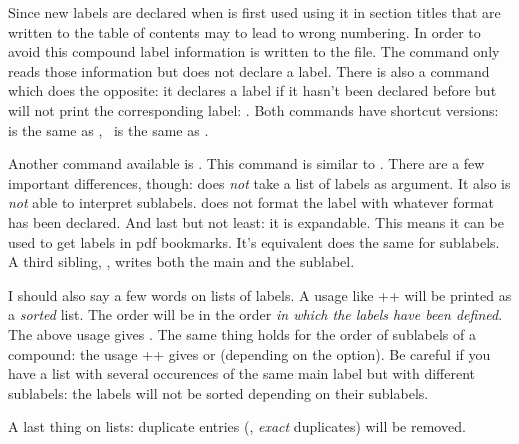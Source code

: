 \documentclass[load-preamble+,ngerman,british,american]{cnltx-doc}
\begin{document}
Since new labels are declared when  is first used using it in section
titles that are written to the table of contents may to lead to wrong
numbering.  In order to avoid this compound label information is written to
the  file.  The command 
only reads those information but does not declare a label.  There is also a
command which does the opposite: it declares a label if it hasn't been
declared before but will not print the corresponding label:
.  Both commands have shortcut
versions: \code{+} is the same as , \sarg\ is
the same as .

Another command available is .  This command is
similar to .  There are a few important differences, though:
 does \emph{not} take a list of labels as argument.  It also is
\emph{not} able to interpret sublabels.   does not format the
label with whatever format has been declared.  And last but not least: it is
expandable.  This means it can be used to get labels in \ac{pdf} bookmarks.
It's equivalent  does
the same for sublabels.  A third sibling, , writes both the main and the sublabel.

I should also say a few words on lists of labels.  A usage like
\verbcode++ will be printed as a \emph{sorted} list.  The order
will be in the order \emph{in which the labels have been defined}.  The above
usage gives .  The same thing holds for the order of sublabels
of a compound: the usage \verbcode++ gives
 or
 (depending on the
 option).  Be careful if you have a list with several
occurences of the same main label but with different sublabels: the labels
will not be sorted depending on their sublabels.
\begin{example}
   \par
   \par
   \par
\end{example}

A last thing on lists: duplicate entries (\ie, \emph{exact} duplicates) will
be removed.
\end{document}
